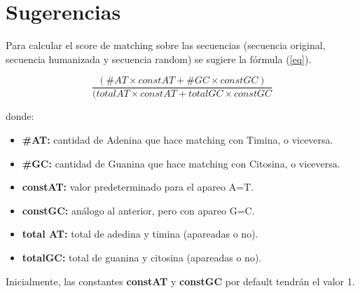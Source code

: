 \section{Sugerencias}
\label{appendix-formulates}

Para calcular el score de matching sobre las secuencias (secuencia original, secuencia humanizada y secuencia random) se sugiere la fórmula (\ref{eq}).

\begin{equation}	
	\label{eq} \frac{(\#AT \times constAT + \#GC \times constGC)}{(totalAT \times constAT + totalGC \times constGC}
\end{equation}	

\par donde:
\begin{itemize}
	\item \textbf{\#AT:} cantidad de Adenina que hace matching con Timina, o viceversa.
	\item \textbf{\#GC:} cantidad de Guanina que hace matching con Citosina, o viceversa.
	\item \textbf{constAT:} valor predeterminado para el apareo A=T.
	\item \textbf{constGC:} análogo al anterior, pero con apareo G=C.
	\item \textbf{total AT:} total de adedina y timina (apareadas o no).
	\item \textbf{totalGC:} total de guanina y citosina (apareadas o no).	
\end{itemize} 

Inicialmente, las constantes \textbf{constAT} y \textbf{constGC} por default tendrán el valor 1.
